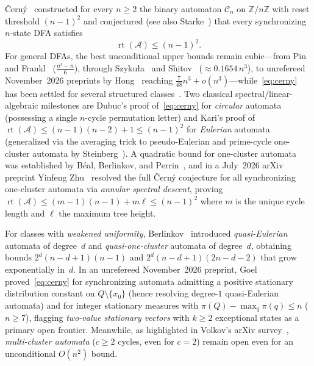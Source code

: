 \documentclass[11pt,a4paper]{article}
\theoremstyle{definition}
\theoremstyle{remark}
\newcommand{\rt}{\operatorname{rt}}
\newcommand{\Z}{\mathbb{Z}}
\newcommand{\cA}{\mathcal{A}}
\newcommand{\cC}{\mathcal{C}}
\begin{document}
\v{C}ern\'y~\cite{Cerny1964} constructed for every $n \ge 2$ the binary automaton $\cC_n$ on $\Z/n\Z$ with reset threshold $(n-1)^2$ and conjectured (see also Starke~\cite{Starke1966}) that every synchronizing $n$-state DFA satisfies
\begin{equation}
  \rt(\cA) \le (n-1)^2.
  \label{eq:cerny}
\end{equation}
For general DFAs, the best unconditional upper bounds remain cubic---from Pin~\cite{Pin1983} and Frankl~\cite{Frankl1982} ($\frac{n^3-n}{6}$), through Szyku\l a~\cite{Szykula2018} and Shitov~\cite{Shitov2019} ($\approx 0.1654\,n^3$), to unrefereed November~2026 preprints by Hong~\cite{Hong2026a,Hong2026b} reaching $\frac{7}{48}n^3 + o(n^3)$---while~\eqref{eq:cerny} has been settled for several structured classes~\cite{Volkov2022,Volkov2026}. Two classical spectral/linear-algebraic milestones are Dubuc's proof of~\eqref{eq:cerny} for \emph{circular} automata~\cite{Dubuc1998} (possessing a single $n$-cycle permutation letter) and Kari's proof of $\rt(\cA) \le (n-1)(n-2)+1 \le (n-1)^2$ for \emph{Eulerian} automata~\cite{Kari2003} (generalized via the averaging trick to pseudo-Eulerian and prime-cycle one-cluster automata by Steinberg~\cite{Steinberg2011}). A quadratic bound for one-cluster automata was established by B\'eal, Berlinkov, and Perrin~\cite{BBP2011}, and in a July~2026 arXiv preprint Yinfeng Zhu~\cite{Zhu2026} resolved the full \v{C}ern\'y conjecture for all synchronizing one-cluster automata via \emph{annular spectral descent}, proving $\rt(\cA) \le (m-1)(n-1) + m\ell \le (n-1)^2$ where $m$ is the unique cycle length and $\ell$ the maximum tree height.

For classes with \emph{weakened uniformity}, Berlinkov~\cite{Berlinkov2012,Berlinkov2013} introduced \emph{quasi-Eulerian} automata of degree~$d$ and \emph{quasi-one-cluster} automata of degree~$d$, obtaining bounds $2^d(n-d+1)(n-1)$ and $2^d(n-d+1)(2n-d-2)$ that grow exponentially in~$d$. In an unrefereed November~2026 preprint, Goel~\cite{Goel2026} proved~\eqref{eq:cerny} for synchronizing automata admitting a positive stationary distribution constant on $Q \setminus \{x_0\}$ (hence resolving degree-$1$ quasi-Eulerian automata) and for integer stationary measures with $\pi(Q) - \max_q \pi(q) \le n$ ($n \ge 7$), flagging \emph{two-value stationary vectors} with $k \ge 2$ exceptional states as a primary open frontier. Meanwhile, as highlighted in Volkov's arXiv survey~\cite{Volkov2026}, \emph{multi-cluster automata} ($c \ge 2$ cycles, even for $c = 2$) remain open even for an unconditional $O(n^2)$ bound.
\end{document}
